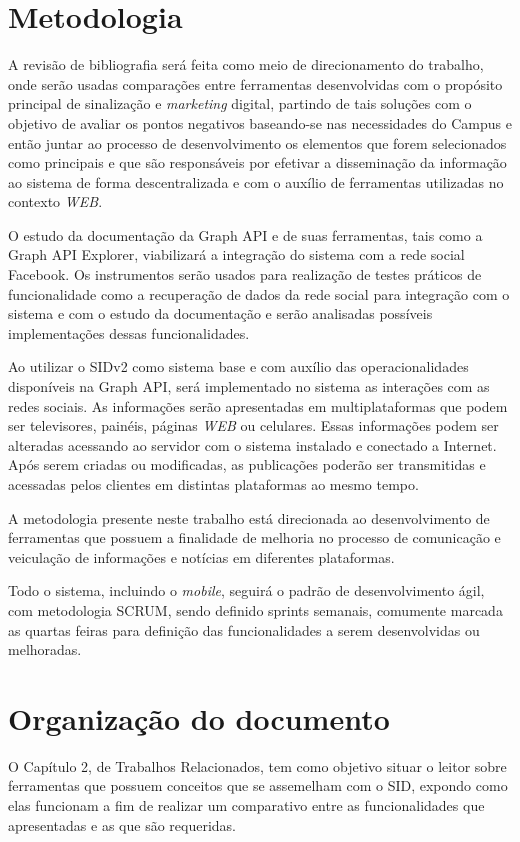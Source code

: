 \section{Metodologia}
A revisão de bibliografia será feita como meio de direcionamento do trabalho, onde serão usadas comparações entre ferramentas desenvolvidas com o propósito principal de sinalização e \textit{marketing} digital, partindo de tais soluções com o objetivo de avaliar os pontos negativos baseando-se nas necessidades do Campus e então juntar ao processo de desenvolvimento os elementos que forem selecionados como principais e que são responsáveis por efetivar a disseminação da informação ao sistema de forma descentralizada e com o auxílio de ferramentas utilizadas no contexto \textit{WEB}.

O estudo da documentação da Graph API e de suas ferramentas, tais como a Graph API Explorer, viabilizará a integração do sistema com a rede social Facebook. Os instrumentos serão usados para realização de testes práticos de funcionalidade como a recuperação de dados da rede social para integração com o sistema e com o estudo da documentação e serão analisadas possíveis implementações dessas funcionalidades.
	 
Ao utilizar o SIDv2 como sistema base e com auxílio das operacionalidades  disponíveis na Graph API, será implementado no sistema as interações com as redes sociais. As informações serão apresentadas em multiplataformas que podem ser televisores, painéis, páginas \textit{WEB} ou celulares. Essas informações podem ser alteradas acessando ao servidor com o sistema instalado e conectado a Internet. Após serem criadas ou modificadas, as publicações poderão ser transmitidas e acessadas pelos clientes em distintas plataformas ao mesmo tempo.

A metodologia presente neste trabalho está direcionada ao desenvolvimento de ferramentas que possuem a finalidade de melhoria no processo de comunicação e veiculação de informações e notícias em diferentes plataformas. 

Todo o sistema, incluindo o \textit{mobile}, seguirá o padrão de desenvolvimento ágil, com metodologia SCRUM, sendo definido sprints semanais, comumente marcada as quartas feiras para definição das funcionalidades a serem desenvolvidas ou melhoradas. 

\section{Organização do documento}
O Capítulo 2, de Trabalhos Relacionados, tem como objetivo situar o leitor sobre ferramentas que possuem conceitos que se assemelham com o SID, expondo como elas funcionam a fim de realizar um comparativo entre as funcionalidades que apresentadas e as que são requeridas.

